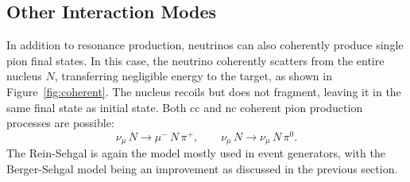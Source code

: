 

\subsection{Other Interaction Modes}
\label{sec:other_interactions}

In addition to resonance production, neutrinos can also coherently produce single pion final states. In this case, the neutrino coherently scatters from the entire nucleus $N$, transferring negligible energy to the target, as shown in Figure~\ref{fig:coherent}. The nucleus recoils but does not fragment, leaving it in the same final state as initial state.
Both \acrshort{cc} and \acrshort{nc} coherent pion production processes are possible:
\begin{equation}
\nu_\mu \, N  \rightarrow \mu^-   \, N \, \pi^+, \qquad
\nu_\mu \, N  \rightarrow \nu_\mu \, N \, \pi^0. 
\end{equation}
The Rein-Sehgal is again the model mostly used in event generators, with the Berger-Sehgal model being an improvement as discussed in the previous section.

